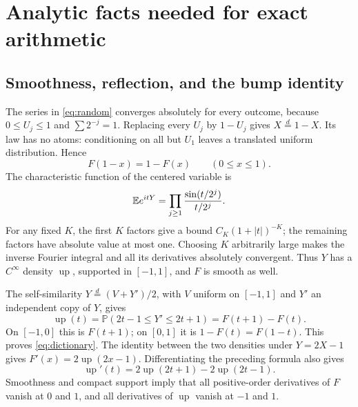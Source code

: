 \documentclass[11pt,oneside]{article}
\theoremstyle{definition}\newtheorem{definition}[theorem]{Definition}
\theoremstyle{remark}\newtheorem{remark}[theorem]{Remark}
\newcommand{\Prob}{\mathbb P}\newcommand{\Up}{\operatorname{up}}
\begin{document}
\section{Analytic facts needed for exact arithmetic}
\label{sec:analytic}

\subsection{Smoothness, reflection, and the bump identity}
The series in \eqref{eq:random} converges absolutely for every outcome, because
$0\le U_j\le1$ and $\sum2^{-j}=1$. Replacing every $U_j$ by $1-U_j$ gives
$X\overset{d}=1-X$. Its law has no atoms: conditioning on all but $U_1$
leaves a translated uniform distribution. Hence
\begin{equation}
 F(1-x)=1-F(x)\qquad(0\le x\le1).
 \label{eq:reflection}
\end{equation}
The characteristic function of the centered variable is
\[
 \mathbb E e^{itY}=\prod_{j\ge1}\frac{\sin(t/2^j)}{t/2^j}.
\]
For any fixed $K$, the first $K$ factors give a bound
$C_K(1+|t|)^{-K}$; the remaining factors have absolute value at most one.
Choosing $K$ arbitrarily large makes the inverse Fourier integral and all its
derivatives absolutely convergent. Thus $Y$ has a $C^\infty$ density $\Up$,
supported in $[-1,1]$, and $F$ is smooth as well.

The self-similarity $Y\overset{d}=(V+Y')/2$, with $V$ uniform on $[-1,1]$
and $Y'$ an independent copy of $Y$, gives
\[
 \Up(t)=\Prob(2t-1\le Y'\le2t+1)=F(t+1)-F(t).
\]
On $[-1,0]$ this is $F(t+1)$; on $[0,1]$ it is $1-F(t)=F(1-t)$.
This proves \eqref{eq:dictionary}. The identity between the two densities
under $Y=2X-1$ gives $F'(x)=2\Up(2x-1)$. Differentiating the preceding
formula also gives
\begin{equation}
 \Up'(t)=2\Up(2t+1)-2\Up(2t-1).
 \label{eq:updiff}
\end{equation}
Smoothness and compact support imply that all positive-order derivatives of
$F$ vanish at $0$ and $1$, and all derivatives of $\Up$ vanish at $-1$ and $1$.
\end{document}
